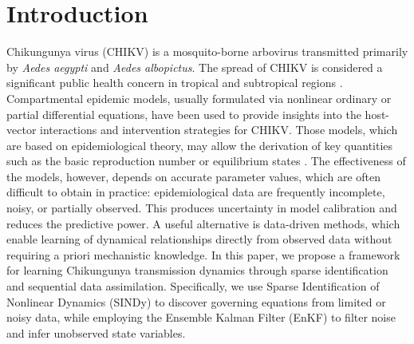 \documentclass[9pt]{article}
\numberwithin{equation}{section}
\begin{document}
\section{Introduction}
Chikungunya virus (CHIKV) is a mosquito-borne arbovirus transmitted primarily by \textit{Aedes aegypti} and \textit{Aedes albopictus}. The spread of CHIKV is considered a significant public health concern in tropical and subtropical regions \cite{morrison, zhao, zhang1}. Compartmental epidemic models, usually formulated via nonlinear ordinary or partial differential equations, have been used to provide insights into the host-vector interactions and intervention strategies for CHIKV. Those models, which are based on epidemiological theory, may allow the derivation of key quantities such as the basic reproduction number or equilibrium states \cite{diekmann, van, yang}. The effectiveness of the models, however, depends on accurate parameter values, which are often difficult to obtain in practice: epidemiological data are frequently incomplete, noisy, or partially observed. This produces uncertainty in model calibration and reduces the predictive power. A useful alternative is data-driven methods, which enable learning of dynamical relationships directly from observed data without requiring a priori mechanistic knowledge. In this paper, we propose a framework for learning Chikungunya transmission dynamics through sparse identification and sequential data assimilation. Specifically, we use Sparse Identification of Nonlinear Dynamics (SINDy) to discover governing equations from limited or noisy data, while employing the Ensemble Kalman Filter (EnKF) to filter noise and infer unobserved state variables.
\end{document}
